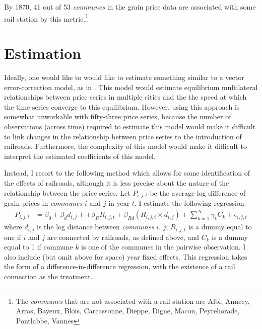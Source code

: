 \documentclass[12pt,twoside]{article}
\begin{document}
By 1870, 41 out of 53 \emph{communes} in the grain price data are associated with some rail station by this metric.\footnote{The \emph{communes} that are not associated with a rail station are Albi, Annecy, Arras, Bayeux, Blois, Carcassonne, Dieppe, Digne, Macon, Peyrehorade, Pontlabbe, Vannes}
	
\section{Estimation}

Ideally, one would like to would like to estimate something similar to a vector error-correction model, as in \cite{johansen}.
This model would estimate equilibrium multilateral relationships between price series in multiple cities and the the speed at which the time series converge to this equilibrium.
However, using this approach is somewhat unworkable with fifty-three price series, because the number of observations (across time) required to estimate this model would make it difficult to link changes in the relationship between price series to the introduction of railroads.
Furthermore, the complexity of this model would make it difficult to interpret the estimated coefficients of this model.

Instead, I resort to the following method which allows for some identification of the effects of railroads, although it is less precise about the nature of the relationship between the price series.
Let $P_{i,j,t}$ be the average log difference of grain prices in \emph{communes} $i$ and $j$  in year $t$. I estimate the following regression:
\begin{align}
	P_{i,j,t} &= \beta_0 + \beta_d d_{i,j} + + \beta_R R_{i,j,t} + \beta_{Rd} (R_{i,j,t} \times d_{i,j}) + \sum_{k=1}^{N} \gamma_k C_k + \epsilon_{i,j,t} \label{eq:reg1}
\end{align}
where $d_{i,j}$ is the log distance between \emph{communes} $i$, $j$; $R_{i,j,t}$ is a dummy equal to one if $i$ and $j$ are connected by railroads, as defined above, and $C_k$ is a dummy equal to 1 if commune $k$ is one of the communes in the pairwise observation.
I also include (but omit above for space) year fixed effects.
This regression takes the form of a difference-in-difference regression, with the existence of a rail connection as the treatment.
\end{document}
